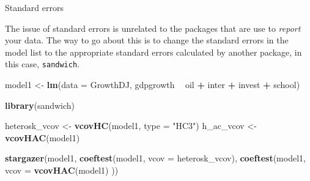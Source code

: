 \documentclass[
  10pt,
  ignorenonframetext,
]{beamer}
\newenvironment{Shaded}{\begin{snugshade}}{\end{snugshade}}
\newcommand{\DataTypeTok}[1]{\textcolor[rgb]{0.13,0.29,0.53}{#1}}
\newcommand{\KeywordTok}[1]{\textcolor[rgb]{0.13,0.29,0.53}{\textbf{#1}}}
\newcommand{\NormalTok}[1]{#1}
\newcommand{\OperatorTok}[1]{\textcolor[rgb]{0.81,0.36,0.00}{\textbf{#1}}}
\newcommand{\StringTok}[1]{\textcolor[rgb]{0.31,0.60,0.02}{#1}}
\begin{document}
\begin{frame}[fragile]{Standard errors}
\protect\hypertarget{standard-errors}{}

The issue of standard errors is unrelated to the packages that are use
to \emph{report} your data. The way to go about this is to change the
standard errors in the model list to the appropriate standard errors
calculated by another package, in this case, \texttt{sandwich}.

\begin{Shaded}
\begin{Highlighting}[]
\NormalTok{model1 <-}\StringTok{ }\KeywordTok{lm}\NormalTok{(}\DataTypeTok{data =}\NormalTok{ GrowthDJ, }
\NormalTok{             gdpgrowth }\OperatorTok{~}\StringTok{ }\NormalTok{oil }\OperatorTok{+}\StringTok{ }\NormalTok{inter }\OperatorTok{+}\StringTok{ }\NormalTok{invest }\OperatorTok{+}\StringTok{ }\NormalTok{school)}

\KeywordTok{library}\NormalTok{(sandwich)}

\NormalTok{heterosk_vcov <-}\StringTok{ }\KeywordTok{vcovHC}\NormalTok{(model1, }\DataTypeTok{type =} \StringTok{"HC3"}\NormalTok{)}
\NormalTok{h_ac_vcov <-}\StringTok{ }\KeywordTok{vcovHAC}\NormalTok{(model1)}

\KeywordTok{stargazer}\NormalTok{(model1, }
          \KeywordTok{coeftest}\NormalTok{(model1, }\DataTypeTok{vcov =}\NormalTok{ heterosk_vcov), }
          \KeywordTok{coeftest}\NormalTok{(model1, }\DataTypeTok{vcov =} \KeywordTok{vcovHAC}\NormalTok{(model1) ))}
\end{Highlighting}
\end{Shaded}

\end{frame}
\end{document}
